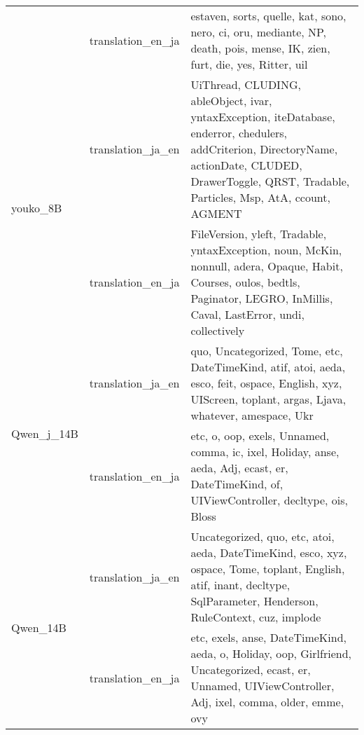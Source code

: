\begin{tabular}{lll}
 & translation_en_ja & estaven, sorts, quelle, kat, sono, nero, ci, oru, mediante, NP, death, pois, mense, IK, zien, furt, die, yes, Ritter, uil \\
\cline{1-3}
\multirow[t]{2}{*}{youko_8B} & translation_ja_en & UiThread, CLUDING, ableObject, ivar, yntaxException, iteDatabase, enderror, chedulers, addCriterion, DirectoryName, actionDate, CLUDED, DrawerToggle, QRST, Tradable, Particles, Msp, AtA, ccount, AGMENT \\
 & translation_en_ja & FileVersion, yleft, Tradable, yntaxException, noun, McKin, nonnull, adera, Opaque, Habit, Courses, oulos, bedtls, Paginator, LEGRO, InMillis, Caval, LastError, undi, collectively \\
\cline{1-3}
\multirow[t]{2}{*}{Qwen_j_14B} & translation_ja_en & quo, Uncategorized, Tome, etc, DateTimeKind, atif, atoi, aeda, esco, feit, ospace, English, xyz, UIScreen, toplant, argas, Ljava, whatever, amespace, Ukr \\
 & translation_en_ja & etc, o, oop, exels, Unnamed, comma, ic, ixel, Holiday, anse, aeda, Adj, ecast, er, DateTimeKind, of, UIViewController, decltype, ois, Bloss \\
\cline{1-3}
\multirow[t]{2}{*}{Qwen_14B} & translation_ja_en & Uncategorized, quo, etc, atoi, aeda, DateTimeKind, esco, xyz, ospace, Tome, toplant, English, atif, inant, decltype, SqlParameter, Henderson, RuleContext, cuz, implode \\
 & translation_en_ja & etc, exels, anse, DateTimeKind, aeda, o, Holiday, oop, Girlfriend, Uncategorized, ecast, er, Unnamed, UIViewController, Adj, ixel, comma, older, emme, ovy \\
\cline{1-3}
\bottomrule
\end{tabular}
